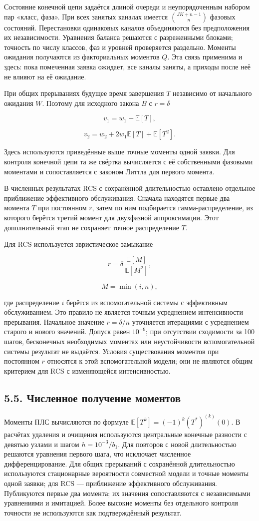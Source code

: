 Состояние конечной цепи задаётся длиной очереди и неупорядоченным набором пар «класс, фаза». При всех занятых каналах имеется \(\binom{JK+n-1}{n}\) фазовых состояний. Перестановки одинаковых каналов объединяются без предположения их независимости. Уравнения баланса решаются с разреженными блоками; точность по числу классов, фаз и уровней проверяется раздельно. Моменты ожидания получаются из факториальных моментов \(Q.\) Эта связь применима и здесь: пока помеченная заявка ожидает, все каналы заняты, а приходы после неё не влияют на её ожидание.

При общих прерываниях будущее время завершения \(T\) независимо от начального ожидания \(W.\) Поэтому для исходного закона \(B\) с \(r=\delta\)


\[v_1=w_1+\mathbb E[T],\]

\[v_2=w_2+2w_1\mathbb E[T]+\mathbb E[T^2].\]


Здесь используются приведённые выше точные моменты одной заявки. Для контроля конечной цепи та же свёртка вычисляется с её собственными фазовыми моментами и сопоставляется с законом Литтла для первого момента.

В численных результатах RCS с сохранённой длительностью оставлено отдельное приближение эффективного обслуживания. Сначала находятся первые два момента \(T\) при постоянном \(r\), затем по ним подбирается гамма-распределение, из которого берётся третий момент для двухфазной аппроксимации. Этот дополнительный этап не сохраняет точное распределение \(T.\)

Для RCS используется эвристическое замыкание


\[r=\delta\,\frac{\mathbb E[M]}{\mathbb E[M^2]},\]

\[M=\min(i,n),\]


где распределение \(i\) берётся из вспомогательной системы с эффективным обслуживанием. Это правило не является точным усреднением интенсивности прерывания. Начальное значение \(r=\delta/n\) уточняется итерациями с усреднением старого и нового значений. Допуск равен \(10^{-9}\); при отсутствии сходимости за 100 шагов, бесконечных необходимых моментах или неустойчивости вспомогательной системы результат не выдаётся. Условия существования моментов при постоянном \(r\) относятся к этой вспомогательной модели; они не являются общим критерием для RCS с изменяющейся интенсивностью.

\subsection*{5.5. Численное получение моментов}
Моменты ПЛС вычисляются по формуле \(\mathbb E[T^k]=(-1)^k(T^*)^{(k)}(0).\) В расчётах удаления и очищения используются центральные конечные разности с девятью узлами и шагом \(h=10^{-3}/b_1.\) Для повторов с новой длительностью решаются уравнения первого шага, что исключает численное дифференцирование. Для общих прерываний с сохранённой длительностью используются стационарные вероятности совместной модели и точные моменты одной заявки; для RCS --- приближение эффективного обслуживания. Публикуются первые два момента; их значения сопоставляются с независимыми уравнениями и имитацией. Более высокие моменты без отдельного контроля точности не используются как подтверждённый результат.

